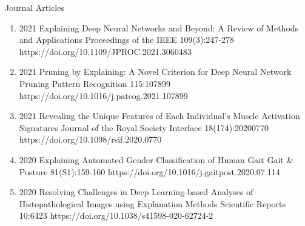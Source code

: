 \documentclass[10pt,a4paper]{article} %
\begin{document}
\headedsection %
{Journal Articles}{ }
{
\begin{enumerate}

    \item[] 
                        {2021}
                        {Explaining Deep Neural Networks and Beyond: A Review of Methods and Applications}
                        {Proceedings of the IEEE}
                        {109(3):247-278}
                        {https://doi.org/10.1109/JPROC.2021.3060483}

    \item[] 
                        {2021}
                        {Pruning by Explaining: A Novel Criterion for Deep Neural Network Pruning}
                        {Pattern Recognition}
                        {115:107899}
                        {https://doi.org/10.1016/j.patcog.2021.107899}

    \item[] 
                        {2021}
                        {Revealing the Unique Features of Each Individual's Muscle Activation Signatures}
                        {Journal of the Royal Society Interface}
                        {18(174):20200770}
                        {https://doi.org/10.1098/rsif.2020.0770}

    \item[] 
                        {2020}
                        {Explaining Automated Gender Classification of Human Gait}
                        {Gait \& Posture}
                        {81(S1):159-160}
                        {https://doi.org/10.1016/j.gaitpost.2020.07.114}

    \item[] 
                        {2020}
                        {Resolving Challenges in Deep Learning-based Analyses of Histopathological Images using Explanation Methods}
                        {Scientific Reports}
                        {10:6423}
                        {https://doi.org/10.1038/s41598-020-62724-2}


\end{enumerate}}
\end{document}
